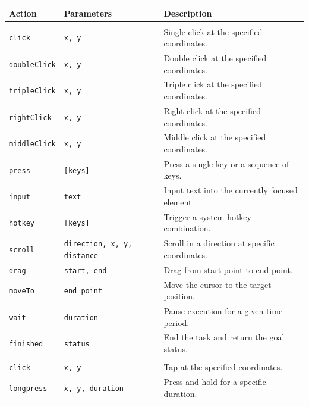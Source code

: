 \documentclass{llmxive}
\providecommand{\arraystretch}{1.1}
\begin{document}
\begin{table}[t]
\centering
\small
\renewcommand{\arraystretch}{1.1} %
\begin{tabular}{l l p{8cm}} %
\toprule
 \textbf{Action} & \textbf{Parameters} & \textbf{Description} \\
\midrule
\rowcolor[gray]{0.9}\multicolumn{3}{l}{\textit{\textbf{Desktop Actions}}} \\ 
\midrule
\texttt{click}        & \texttt{x, y}             & Single click at the specified coordinates. \\
\texttt{doubleClick}  & \texttt{x, y}             & Double click at the specified coordinates. \\
\texttt{tripleClick}  & \texttt{x, y}             & Triple click at the specified coordinates. \\
\texttt{rightClick}   & \texttt{x, y}             & Right click at the specified coordinates. \\
\texttt{middleClick}  & \texttt{x, y}             & Middle click at the specified coordinates. \\
\texttt{press}        & \texttt{[keys]}           & Press a single key or a sequence of keys. \\
\texttt{input}        & \texttt{text}             & Input text into the currently focused element. \\
\texttt{hotkey}       & \texttt{[keys]}           & Trigger a system hotkey combination. \\
\texttt{scroll}       & \texttt{direction, x, y, distance}  & Scroll in a direction at specific coordinates. \\
\texttt{drag}         & \texttt{start, end}       & Drag from start point to end point. \\
\texttt{moveTo}       & \texttt{end\_point}       & Move the cursor to the target position. \\
\texttt{wait}         & \texttt{duration}         & Pause execution for a given time period. \\
\texttt{finished}     & \texttt{status}           & End the task and return the goal status. \\
\midrule
\rowcolor[gray]{0.9}\multicolumn{3}{l}{\textit{\textbf{Mobile Actions}}} \\ 
\midrule
\texttt{click}        & \texttt{x, y}             & Tap at the specified coordinates. \\
\texttt{longpress}    & \texttt{x, y, duration}        & Press and hold for a specific duration. \\

\end{tabular}
\end{table}
\end{document}
